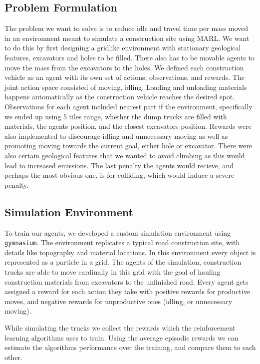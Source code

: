 \documentclass[conference]{IEEEtran}
\begin{document}
\subsection{Problem Formulation}
The problem we want to solve is to reduce idle and travel time per mass moved in an environment meant to simulate a construction site using MARL.
We want to do this by first designing a gridlike environment with stationary geological features, excavators and holes to be filled. There also has to be movable agents to move the mass from the excavators to the holes.
We defined each construction vehicle as an agent with its own set of actions, observations, and rewards. 
The joint action space consisted of moving, idling. Loading and unloading materials happens automatically as the construction vehicle reaches the desired spot. Observations for each agent included nearest part if the environment, specifically we ended up using 5 tiles range, whether the dump trucks are filled with materials, the agents position, and the closest excavators position.
Rewards were also implemented to discourage idling and unnecessary moving as well as promoting moving towards the current goal, either hole or excavator. 
There were also certain geological features that we wanted to avoid climbing as this would lead to increased emissions. 
The last penalty the agents would recieve, and perhaps the most obvious one, is for colliding, which would induce a severe penalty.


\subsection{Simulation Environment}
To train our agents, we developed a custom simulation environment using \texttt{gymnasium}. The environment replicates a typical road construction site, with details like topography and material locations. In this environment every object is represented as a particle in a grid.
The agents of the simulation, construction trucks are able to move cardinally in this grid with the goal of hauling construction materials from excavators to the unfinished road.
Every agent gets assigned a reward for each action they take with positive rewards for productive moves, and negative rewards for unproductive ones (idling, or unnecessary moving).

While simulating the trucks we collect the rewards which the reinforcement learning algorithms uses to train.
Using the average episodic rewards we can estimate the algorithms performance over the training, and compare them to each other.
\end{document}
